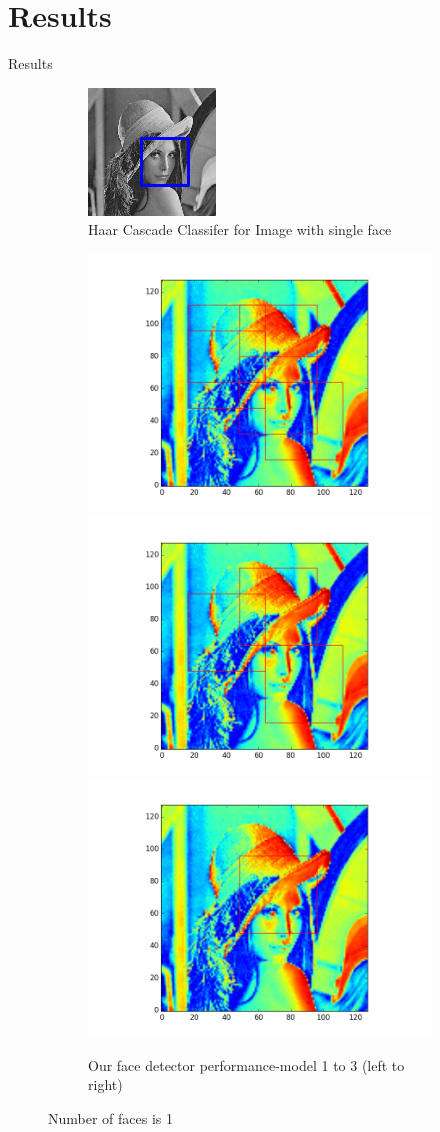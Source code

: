 \documentclass{beamer}
\begin{document}
\section{Results}
\begin{frame}{Results}
  \begin{figure}[h]
  \begin{subfigure}{\linewidth}
  \centering
  \includegraphics[width=.3\linewidth]{lenahaar.png}\hfill
  \caption{Haar Cascade Classifer for Image with single face}
  \end{subfigure}\par\medskip
  \begin{subfigure}{\linewidth}
  \includegraphics[width=.3\linewidth]{lena83.png}\hfill
  \includegraphics[width=.3\linewidth]{lena91.png}\hfill
  \includegraphics[width=.3\linewidth]{lena94.png}
  \caption{Our face detector performance-model 1 to 3 (left to right)}
  \end{subfigure}\par\medskip
  \caption{Number of faces is 1}
\end{figure}
\end{frame}
\end{document}
